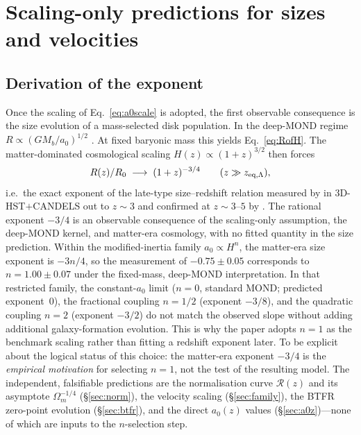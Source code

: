 \documentclass[twocolumn,letterpaper]{aastex631}
\newcommand{\azero}{a_0}
\begin{document}
\section{Scaling-only predictions for sizes and velocities}\label{sec:predictions}

\subsection{Derivation of the exponent}\label{sec:exp}

Once the scaling of Eq.~\ref{eq:a0scale} is adopted, the first
observable consequence is the size evolution of a mass-selected
disk population.  In the deep-MOND regime
$R\propto(GM_b/\azero)^{1/2}$ \citep{Milgrom1983,FamaeyMcGaugh2012}.
At fixed baryonic mass this yields
Eq.~\ref{eq:RofH}.  The matter-dominated cosmological scaling
$H(z)\propto(1+z)^{3/2}$ then forces
\begin{equation}\label{eq:Rexp}
  R(z)/R_{0}\;\longrightarrow\;(1+z)^{-3/4}
  \qquad(z\gg z_{\rm eq,\Lambda}),
\end{equation}
i.e.\ the exact exponent of the late-type size--redshift
relation measured by \citet{vanderWel2014} in $3$D-HST$+$CANDELS
out to $z\!\sim\!3$ and confirmed at $z\!\sim\!3$--$5$ by
\citet{Allen2017}.  The rational exponent $-3/4$ is an
observable consequence of the scaling-only assumption, the
deep-MOND kernel, and matter-era cosmology, with no fitted
quantity in the size prediction.  Within
the modified-inertia family $\azero\propto H^{n}$, the matter-era
size exponent is $-3n/4$, so the \citet{vanderWel2014} measurement
of $-0.75\pm 0.05$ corresponds to $n=1.00\pm 0.07$ under the
fixed-mass, deep-MOND interpretation.  In that restricted family,
the constant-$\azero$ limit ($n=0$, standard MOND; predicted
exponent~$0$), the fractional coupling $n=1/2$ (exponent $-3/8$),
and the quadratic coupling $n=2$ (exponent $-3/2$) do not match
the observed slope without adding additional galaxy-formation
evolution.  This is why the paper adopts $n=1$ as the benchmark
scaling rather than fitting a redshift exponent later.
To be explicit about the logical status of this choice: the
matter-era exponent $-3/4$ is the \emph{empirical motivation}
for selecting $n\!=\!1$, not the test of the resulting model.
The independent, falsifiable predictions are the
normalisation curve $\mathcal{R}(z)$ and its asymptote
$\Omega_{m}^{-1/4}$ (\S\ref{sec:norm}), the velocity scaling
(\S\ref{sec:family}), the BTFR zero-point evolution
(\S\ref{sec:btfr}), and the direct $\azero(z)$ values
(\S\ref{sec:a0z})---none of which are inputs to the
$n$-selection step.
\end{document}
